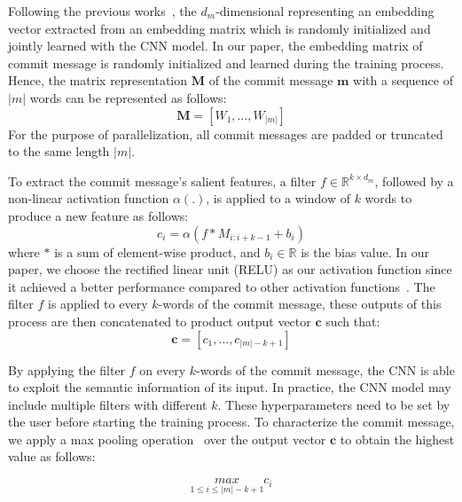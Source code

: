 Following the previous works~\cite{kim2014convolutional, zhang2015character}, the $d_m$-dimensional representing an embedding vector extracted from an embedding matrix which is randomly initialized and jointly learned with the CNN model. In our paper, the embedding matrix of commit message is randomly initialized and learned during the training process. Hence, the matrix representation $\textbf{M}$ of the commit message $\textbf{m}$ with a sequence of $|m|$ words can be represented as follows:
\begin{equation}
\label{eq:representation_msg}
    \textbf{M} = [W_1, \dots, W_{|m|}]
\end{equation}
For the purpose of parallelization, all commit messages are padded or truncated to the same length $|m|$. 

To extract the commit message's salient features, a filter $f \in \mathbb{R}^{k \times {d_m}}$, followed by a non-linear activation function $\alpha (.)$, is applied to a window of $k$ words to produce a new feature as follows:
\begin{equation}
\label{eq:filter_msg}
    c_i = \alpha(f * M_{i:i+k-1} + b_i)
\end{equation}
where $*$ is a sum of element-wise product, and $b_i \in \mathbb{R}$ is the bias value. In our paper, we choose the rectified linear unit (RELU) as our activation function since it achieved a better performance compared to other activation functions~\cite{nair2010rectified, dahl2013improving, he2016deep}. The filter $f$ is applied to every $k$-words of the commit message, these outputs of this process are then concatenated to product output vector $\textbf{c}$ such that:
\begin{equation}
\label{eq:output_ftr_msg}
\textbf{c} = [c_1, \dots, c_{|m| - k + 1}]
\end{equation}

By applying the filter $f$ on every $k$-words of the commit message, the CNN is able to exploit the semantic information of its input. In practice, the CNN model may include multiple filters with different $k$. These hyperparameters need to be set by the user before starting the training process. To characterize the commit message, we apply a max pooling operation~\cite{lecun2015deep} over the output vector $\textbf{c}$ to obtain the highest value as follows: 

\begin{equation}
\label{eq:max_pooling_msg}
\underset{1 \leq i \leq |m| - k + 1}{max} c_i
\end{equation}

